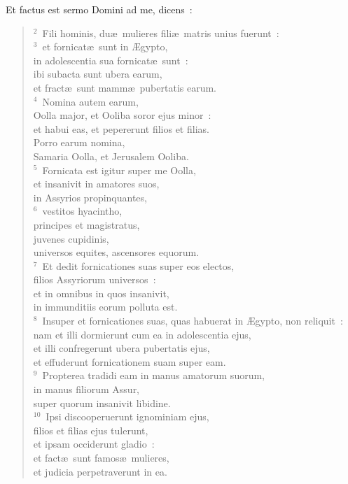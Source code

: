 \lettrine[lines=10,image=true,loversize=0.05,lraise=-0.03]{E}{}t factus est sermo Domini ad me, dicens~:
\begin{flushleft}\begin{verse}\vspace{6pt}${}^{2}$~Fili hominis, du\ae\ mulieres fili\ae\ matris unius fuerunt~:\\
${}^{3}$~et fornicat\ae\ sunt in \AE gypto,\\ in adolescentia sua fornicat\ae\ sunt~:\\ ibi subacta sunt ubera earum,\\ et fract\ae\ sunt mamm\ae\ pubertatis earum.\\
${}^{4}$~Nomina autem earum,\\ Oolla major, et Ooliba soror ejus minor~:\\ et habui eas, et pepererunt filios et filias.\\ Porro earum nomina,\\ Samaria Oolla, et Jerusalem Ooliba.\\
${}^{5}$~Fornicata est igitur super me Oolla,\\ et insanivit in amatores suos,\\ in Assyrios propinquantes,\\
${}^{6}$~vestitos hyacintho,\\ principes et magistratus,\\ juvenes cupidinis,\\ universos equites, ascensores equorum.\\
${}^{7}$~Et dedit fornicationes suas super eos electos,\\ filios Assyriorum universos~:\\ et in omnibus in quos insanivit,\\ in immunditiis eorum polluta est.\\
${}^{8}$~Insuper et fornicationes suas, quas habuerat in \AE gypto, non reliquit~:\\ nam et illi dormierunt cum ea in adolescentia ejus,\\ et illi confregerunt ubera pubertatis ejus,\\ et effuderunt fornicationem suam super eam.\\
${}^{9}$~Propterea tradidi eam in manus amatorum suorum,\\ in manus filiorum Assur,\\ super quorum insanivit libidine.\\
${}^{10}$~Ipsi discooperuerunt ignominiam ejus,\\ filios et filias ejus tulerunt,\\ et ipsam occiderunt gladio~:\\ et fact\ae\ sunt famos\ae\ mulieres,\\ et judicia perpetraverunt in ea.\\

\end{verse}
\end{flushleft}
